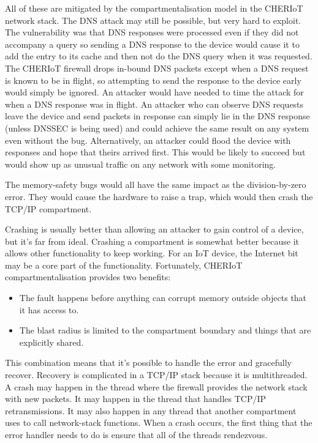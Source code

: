 All of these are mitigated by the compartmentalisation model in the CHERIoT network stack.
The DNS attack may still be possible, but very hard to exploit.
The vulnerability was that DNS responses were processed even if they did not accompany a query so sending a DNS response to the device would cause it to add the entry to its cache and then not do the DNS query when it was requested.
The CHERIoT firewall drops in-bound DNS packets except when a DNS request is known to be in flight, so attempting to send the response to the device early would simply be ignored.
An attacker would have needed to time the attack for when a DNS response was in flight.
An attacker who can observe DNS requests leave the device and send packets in response can simply lie in the DNS response (unless DNSSEC is being used) and could achieve the same result on any system even without the bug.
Alternatively, an attacker could flood the device with responses and hope that theirs arrived first.
This would be likely to succeed but would show up as unusual traffic on any network with some monitoring.

The memory-safety bugs would all have the same impact as the division-by-zero error.
They would cause the hardware to raise a trap, which would then crash the TCP/IP compartment.

Crashing is usually better than allowing an attacker to gain control of a device, but it's far from ideal.
Crashing a compartment is somewhat better because it allows other functionality to keep working.
For an IoT device, the Internet bit may be a core part of the functionality.
Fortunately, CHERIoT compartmentalisation provides two benefits:

\begin{itemize}
	\item{The fault happens before anything can corrupt memory outside objects that it has access to.}
	\item{The blast radius is limited to the compartment boundary and things that are explicitly shared.}
\end{itemize}

This combination means that it's possible to handle the error and gracefully recover.
Recovery is complicated in a TCP/IP stack because it is multithreaded.
A crash may happen in the thread where the firewall provides the network stack with new packets.
It may happen in the thread that handles TCP/IP retransmissions.
It may also happen in any thread that another compartment uses to call network-stack functions.
When a crash occurs, the first thing that the error handler needs to do is ensure that all of the threads rendezvous.


